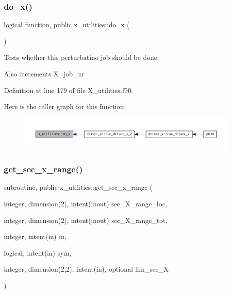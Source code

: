 \subsubsection{\texorpdfstring{do\+\_\+x()}{do\_x()}}
{\footnotesize\ttfamily logical function, public x\+\_\+utilities\+::do\+\_\+x (\begin{DoxyParamCaption}{ }\end{DoxyParamCaption})}



Tests whether this perturbatino job should be done. 

Also increments {\ttfamily X\+\_\+job\+\_\+nr} 

Definition at line 179 of file X\+\_\+utilities.\+f90.

Here is the caller graph for this function\+:\nopagebreak
\begin{figure}[H]
\begin{center}
\leavevmode
\includegraphics[width=350pt]{namespacex__utilities_adef8eab82f0fd670a7795c754cf9a8f9_icgraph}
\end{center}
\end{figure}
\mbox{\label{namespacex__utilities_a6072ddd1fd230758795ff320c75a1f6a}} 
\subsubsection{\texorpdfstring{get\+\_\+sec\+\_\+x\+\_\+range()}{get\_sec\_x\_range()}}
{\footnotesize\ttfamily subroutine, public x\+\_\+utilities\+::get\+\_\+sec\+\_\+x\+\_\+range (\begin{DoxyParamCaption}\item[{integer, dimension(2), intent(inout)}]{sec\+\_\+\+X\+\_\+range\+\_\+loc,  }\item[{integer, dimension(2), intent(inout)}]{sec\+\_\+\+X\+\_\+range\+\_\+tot,  }\item[{integer, intent(in)}]{m,  }\item[{logical, intent(in)}]{sym,  }\item[{integer, dimension(2,2), intent(in), optional}]{lim\+\_\+sec\+\_\+X }\end{DoxyParamCaption})}



